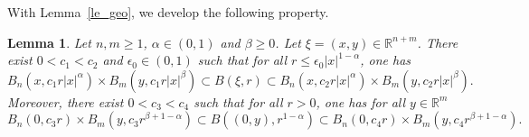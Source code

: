 \documentclass[12pt]{amsart}
\theoremstyle{plain}
\newtheorem{lemma}[theorem]{Lemma}
\theoremstyle{definition}
\numberwithin{equation}{section}
\begin{document}
With Lemma~\ref{le_geo}, we develop the following property.


\begin{lemma}\label{le_volume}
Let $n,m\ge 1$, $\alpha\in (0,1)$ and $\beta\ge 0$. Let $\xi=(x,y)\in \mathbb{R}^{n+m}$. There exist $0<c_1<c_2$ and $\epsilon_0 \in (0,1)$ such that for all $r\le \epsilon_0 |x|^{1-\alpha}$, one has
\begin{equation}
    B_n(x, c_1 r |x|^\alpha) \times B_m(y, c_1 r |x|^\beta) \subset B(\xi, r) \subset B_n(x, c_2 r |x|^\alpha) \times B_m(y, c_2 r |x|^\beta).
\end{equation}
Moreover, there exist $0<c_3<c_4$ such that for all $r>0$, one has for all $y\in \mathbb{R}^m$
\begin{equation}\label{le_volume3}
    B_n(0, c_3 r) \times B_m(y, c_3 r^{\beta+1-\alpha}) \subset B((0,y), r^{1-\alpha}) \subset B_n(0, c_4 r) \times B_m(y, c_4 r^{\beta+1-\alpha}).
\end{equation}
\end{lemma}
\end{document}
